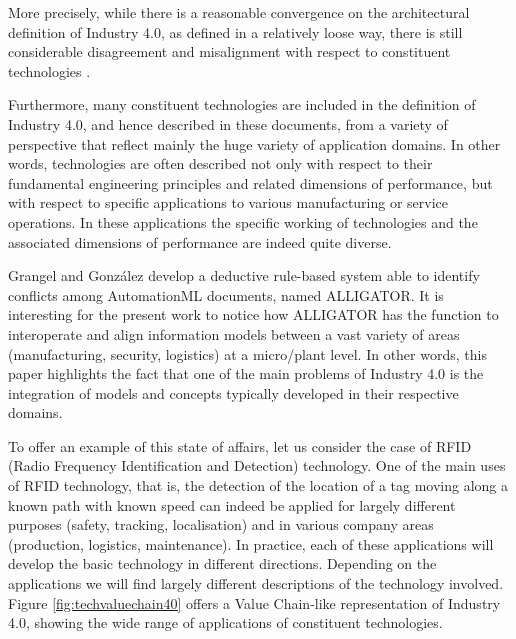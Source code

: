 \documentclass[]{book}
\begin{document}
More precisely, while there is a reasonable convergence on the
architectural definition of Industry 4.0, as defined in a relatively
loose way, there is still considerable disagreement and misalignment
with respect to constituent technologies
\citep[\citet{smit2016industry},\citet{o2015industrial}]{riel2017integrated}.

Furthermore, many constituent technologies are included in the
definition of Industry 4.0, and hence described in these documents, from
a variety of perspective that reflect mainly the huge variety of
application domains. In other words, technologies are often described
not only with respect to their fundamental engineering principles and
related dimensions of performance, but with respect to specific
applications to various manufacturing or service operations. In these
applications the specific working of technologies and the associated
dimensions of performance are indeed quite diverse.

Grangel and González \citep{grangel2016towards} develop a deductive
rule-based system able to identify conflicts among AutomationML
documents, named ALLIGATOR. It is interesting for the present work to
notice how ALLIGATOR has the function to interoperate and align
information models between a vast variety of areas (manufacturing,
security, logistics) at a micro/plant level. In other words, this paper
highlights the fact that one of the main problems of Industry 4.0 is the
integration of models and concepts typically developed in their
respective domains.

To offer an example of this state of affairs, let us consider the case
of RFID (Radio Frequency Identification and Detection) technology. One
of the main uses of RFID technology, that is, the detection of the
location of a tag moving along a known path with known speed can indeed
be applied for largely different purposes (safety, tracking,
localisation) and in various company areas (production, logistics,
maintenance). In practice, each of these applications will develop the
basic technology in different directions. Depending on the applications
we will find largely different descriptions of the technology involved.
Figure \ref{fig:techvaluechain40} offers a Value Chain-like
representation of Industry 4.0, showing the wide range of applications
of constituent technologies.
\end{document}
